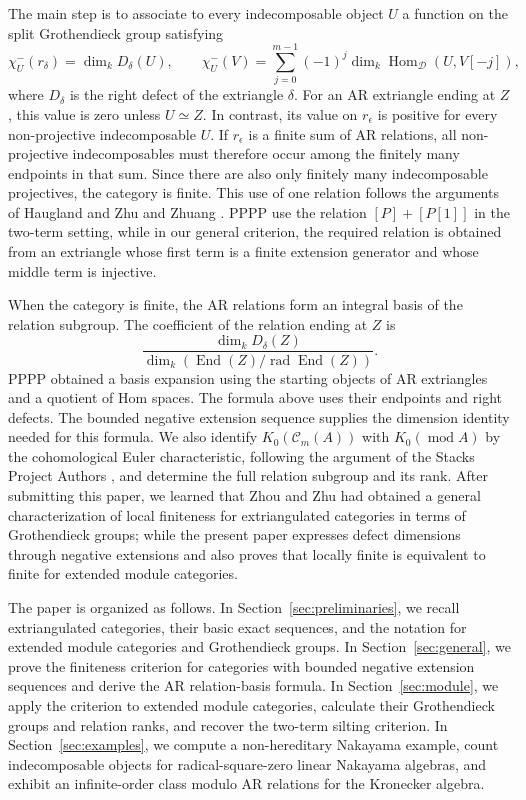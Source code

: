 \documentclass[pdflatex,sn-mathphys-num]{sn-jnl}
\numberwithin{equation}{section}
\theoremstyle{definition}
\theoremstyle{remark}\newtheorem{remark}[theorem]{Remark}
\newcommand{\C}{\mathcal C}
\newcommand{\D}{\mathcal D}
\newcommand{\Hom}{\operatorname{Hom}}
\newcommand{\End}{\operatorname{End}}
\newcommand{\rad}{\operatorname{rad}}
\newcommand{\modu}{\operatorname{mod}}
\newcommand{\dimk}{\dim_k}
\begin{document}
The main step is to associate to every indecomposable object $U$ a
function on the split Grothendieck group satisfying
\[
 \chi^-_U(r_\delta)=\dimk D_\delta(U),\qquad
 \chi^-_U(V)=\sum_{j=0}^{m-1}(-1)^j\dimk\Hom_{\D}(U,V[-j]),
\]
where $D_\delta$ is the right defect of the extriangle $\delta$.
For an AR extriangle ending at $Z$, this value is zero unless
$U\simeq Z$. In contrast, its value on $r_\epsilon$ is positive for
every non-projective indecomposable $U$. If $r_\epsilon$ is a finite
sum of AR relations, all non-projective indecomposables must therefore
occur among the finitely many endpoints in that sum. Since there are
also only finitely many indecomposable projectives, the category is finite.
This use of one relation follows the arguments of Haugland
\cite{Haugland} and Zhu and Zhuang
\cite{ZZ}. PPPP
\cite{PPPP} use the relation $[P]+[P[1]]$
in the two-term setting, while in our general criterion, the required
relation is obtained from an extriangle whose first term is a finite
extension generator and whose middle term is injective.

When the category is finite, the AR relations form an integral basis
of the relation subgroup. The coefficient of the relation ending at
$Z$ is
\[
 \frac{\dimk D_\delta(Z)}{\dimk(\End(Z)/\rad\End(Z))}.
\]
PPPP \cite{PPPP} obtained a basis
expansion using the starting objects of AR extriangles and a quotient
of Hom spaces. The formula above uses their endpoints and right
defects. The bounded negative extension sequence supplies the
dimension identity needed for this formula. We also identify
$K_0(\C_m(A))$ with $K_0(\modu A)$ by the cohomological Euler
characteristic, following the argument of the Stacks Project Authors
\cite[Lemma 13.28.2, Tag 0FCP]{Stacks}, and determine the full relation
subgroup and its rank. After submitting this paper, we learned that Zhou and Zhu\cite{ZhouZhu} had obtained a general characterization of local finiteness for extriangulated categories in terms of Grothendieck groups; while the present paper expresses defect dimensions through negative extensions and also proves that locally finite is equivalent to finite for extended module categories.

The paper is organized as follows. In Section~\ref{sec:preliminaries},
we recall extriangulated categories, their basic exact sequences,
and the notation for extended module categories and Grothendieck
groups. In Section~\ref{sec:general}, we prove the finiteness criterion
for categories with bounded negative extension sequences and derive
the AR relation-basis formula. In Section~\ref{sec:module}, we apply
the criterion to extended module categories, calculate their
Grothendieck groups and relation ranks, and recover the two-term
silting criterion. In Section~\ref{sec:examples}, we compute a
non-hereditary Nakayama example, count indecomposable objects for
radical-square-zero linear Nakayama algebras, and exhibit an
infinite-order class modulo AR relations for the Kronecker algebra.
\end{document}
